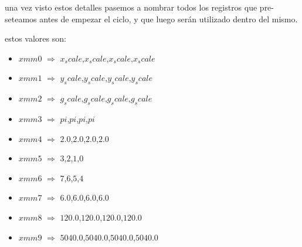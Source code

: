 una vez visto estos detalles pasemos a nombrar todos los registros que pre-seteamos antes de empezar el ciclo, y que luego serán utilizado dentro del mismo.

estos valores son:
\begin{itemize}
	\item $xmm0$ $\Rightarrow$ $x_scale$,$x_scale$,$x_scale$,$x_scale$
	\item $xmm1$ $\Rightarrow$ $y_scale$,$y_scale$,$y_scale$,$y_scale$
	\item $xmm2$ $\Rightarrow$ $g_scale$,$g_scale$,$g_scale$,$g_scale$
	\item $xmm3$ $\Rightarrow$ $pi$,$pi$,$pi$,$pi$
	\item $xmm4$ $\Rightarrow$ $2.0$,$2.0$,$2.0$,$2.0$
	\item $xmm5$ $\Rightarrow$ $3$,$2$,$1$,$0$
	\item $xmm6$ $\Rightarrow$ $7$,$6$,$5$,$4$
	\item $xmm7$ $\Rightarrow$ $6.0$,$6.0$,$6.0$,$6.0$
	\item $xmm8$ $\Rightarrow$ $120.0$,$120.0$,$120.0$,$120.0$
	\item $xmm9$ $\Rightarrow$ $5040.0$,$5040.0$,$5040.0$,$5040.0$
\end{itemize}

